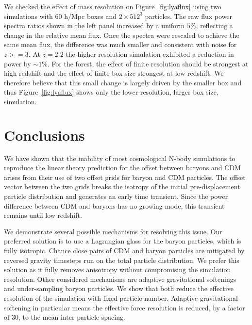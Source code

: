 \documentclass[a4paper,11pt]{article}
\begin{document}
We checked the effect of mass resolution on Figure~\ref{fig:lyaflux} using two simulations with $60$ h/Mpc boxes and $2\times 512^3$ particles. The raw flux power spectra ratios shown in the left panel increased by a uniform $5\%$, reflecting a change in the relative mean flux. Once the spectra were rescaled to achieve the same mean flux, the difference was much smaller and consistent with noise for $z >= 3$. At $z=2.2$ the higher resolution simulation exhibited a reduction in power by $\sim 1\%$. For the forest, the effect of finite resolution should be strongest at high redshift \cite{Bolton:2009} and the effect of finite box size strongest at low redshift. We therefore believe that this small change is largely driven by the smaller box and thus Figure~\ref{fig:lyaflux} shows only the lower-resolution, larger box size, simulation.

\section{Conclusions}
\label{sec:conclude}

We have shown that the inability of most cosmological N-body simulations to reproduce the linear theory prediction for the offset between baryons and CDM arises from their use of two offset grids for baryon and CDM particles. The offset vector between the two grids breaks the isotropy of the initial pre-displacement particle distribution and generates an early time transient. Since the power difference between CDM and baryons has no growing mode, this transient remains until low redshift.

We demonstrate several possible mechanisms for resolving this issue. Our preferred solution is to use a Lagrangian glass for the baryon particles, which is fully isotropic. Chance close pairs of CDM and baryon particles are mitigated by reversed gravity timesteps run on the total particle distribution. We prefer this solution as it fully removes anisotropy without compromising the simulation resolution. Other considered mechanisms are adaptive gravitational softenings and under-sampling baryon particles. We show that both reduce the effective resolution of the simulation with fixed particle number. Adaptive gravitational softening in particular means the effective force resolution is reduced, by a factor of $30$, to the mean inter-particle spacing.
\end{document}
